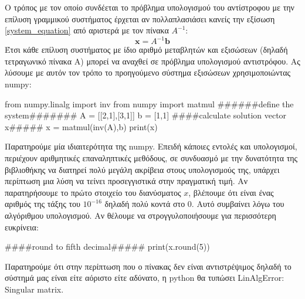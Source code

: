 Ο τρόπος με τον οποίο συνδέεται το πρόβλημα υπολογισμού του αντίστροφου με την επίλυση γραμμικού συστήματος έρχεται αν πολλαπλασιάσει κανείς την εξίσωση \eqref{system_equation} από αριστερά με τον πίνακα $Α^{-1}$:
\begin{equation}
\mathbf{x}= A^{-1} \mathbf{b}
\label{system_equation}
\end{equation}
Έτσι κάθε επίλυση συστήματος με ίδιο αριθμό μεταβλητών και εξισώσεων (δηλαδή τετραγωνικό πίνακα Α) μπορεί να αναχθεί σε πρόβλημα υπολογισμού αντιστρόφου. Ας λύσουμε με αυτόν τον τρόπο το προηγούμενο σύστημα εξισώσεων χρησιμοποιώντας {\en numpy}: 
\en
\begin{python}
from numpy.linalg import inv
from numpy import matmul
######define the system#######
A = [[2,1],[3,1]]
b = [1,1]
####calculate solution vector x#####
x = matmul(inv(A),b)
print(x)
\end{python}
\vspace*{-0.7cm}
\begin{codeout}
[1.11022302e-16 1.00000000e+00]
\end{codeout}
\gr
Παρατηρούμε μία ιδιαιτερότητα της {\en numpy}. Επειδή κάποιες εντολές και υπολογισμοί, περιέχουν αριθμητικές επαναληπτικές μεθόδους, σε συνδυασμό με την δυνατότητα της βιβλιοθήκης να διατηρεί πολύ μεγάλη ακρίβεια στους υπολογισμούς της, υπάρχει περίπτωση μια λύση να τείνει προσεγγιστικά στην πραγματική τιμή. Αν παρατηρήσουμε το πρώτο στοιχείο του διανύσματος $x$, βλέπουμε ότι είναι ένας αριθμός της τάξης του $10^{-16}$ δηλαδή πολύ κοντά στο $0$. Αυτό συμβαίνει λόγω του αλγόριθμου υπολογισμού. Αν θέλουμε να στρογγυλοποιήσουμε για περισσότερη ευκρίνεια:
\en
\begin{python}
####round to fifth decimal#####
print(x.round(5))
\end{python}
\vspace*{-0.7cm}
\begin{codeout}
[0. 1.]
\end{codeout}
\gr
Παρατηρούμε ότι στην περίπτωση που ο πίνακας δεν είναι αντιστρέψιμος δηλαδή το σύστημά μας είναι είτε αόριστο είτε αδύνατο, η python θα τυπώσει {\en LinAlgError: Singular matrix}.
